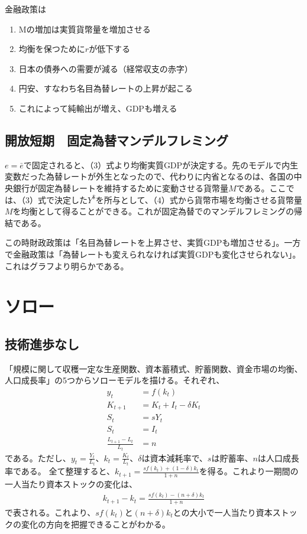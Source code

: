 \documentclass{jsarticle}
\begin{document}
金融政策は
\begin{enumerate}
	\item Mの増加は実質貨幣量を増加させる
	\item 均衡を保つために$r$が低下する
	\item 日本の債券への需要が減る（経常収支の赤字）
	\item 円安、すなわち名目為替レートの上昇が起こる
	\item これによって純輸出が増え、GDPも増える
\end{enumerate}

\subsection{開放短期　固定為替マンデルフレミング}
$e = \bar{e}$で固定されると、（3）式より均衡実質GDPが決定する。先のモデルで内生変数だった為替レートが外生となったので、代わりに内省となるのは、各国の中央銀行が固定為替レートを維持するために変動させる貨幣量$M$である。ここでは、（3）式で決定した$Y^{\$}$を所与として、（4）式から貨幣市場を均衡させる貨幣量$M$を均衡として得ることができる。これが固定為替でのマンデルフレミングの帰結である。

この時財政政策は「名目為替レートを上昇させ、実質GDPも増加させる」。一方で金融政策は「為替レートも変えられなければ実質GDPも変化させられない」。これはグラフより明らかである。

\section{ソロー}
\subsection{技術進歩なし}
「規模に関して収穫一定な生産関数、資本蓄積式、貯蓄関数、資金市場の均衡、人口成長率」の5つからソローモデルを描ける。それぞれ、
\begin{align*}
	y_t &= f(k_t)\\
	K_{t+1} &= K_t + I_t - \delta K_t\\
	S_t &= s Y_t\\
	S_t &= I_t\\
	\frac{L_{t+1} - L_t}{L_t} &= n
\end{align*}
である。ただし、$y_t = \frac{Y_t}{L_t}$、$k_t = \frac{K_t}{L_t}$、$\delta$は資本減耗率で、$s$は貯蓄率、$n$は人口成長率である。
全て整理すると、$k_{t+1} = \frac{sf(k_t) + (1 - \delta)k_t}{1+n}$を得る。これより一期間の一人当たり資本ストックの変化は、
\begin{align}
	k_{t+1} - k_t = \frac{sf(k_t) - (n+\delta)k_t}{1+n}
\end{align}
で表される。これより、$sf(k_t)$と$(n+\delta)k_t$との大小で一人当たり資本ストックの変化の方向を把握できることがわかる。
\end{document}

